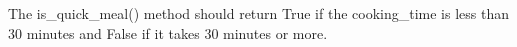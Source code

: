 \documentclass{article}
\newcommand{\tab}{\hspace*{0.25in}}
\begin{document}
\begin{enumerate}
	The is\_quick\_meal() method should return True if the cooking\_time is less than 30 minutes and False 
	if it takes 30 minutes or more.\\
	





\end{enumerate}
\end{document}
